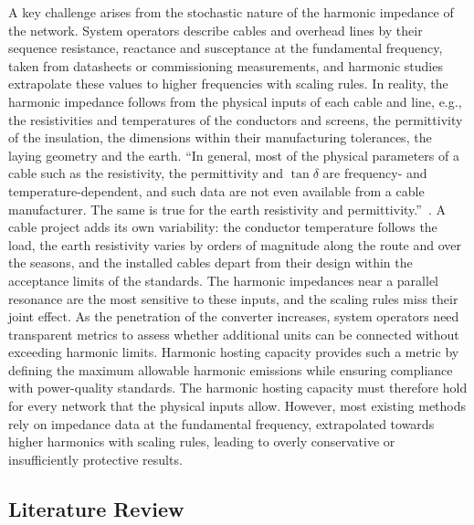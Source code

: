 A key challenge arises from the stochastic nature of the harmonic impedance of the network. System operators describe cables and overhead lines by their sequence resistance, reactance and susceptance at the fundamental frequency, taken from datasheets or commissioning measurements, and harmonic studies extrapolate these values to higher frequencies with scaling rules. In reality, the harmonic impedance follows from the physical inputs of each cable and line, e.g., the resistivities and temperatures of the conductors and screens, the permittivity of the insulation, the dimensions within their manufacturing tolerances, the laying geometry and the earth. ``In general, most of the physical parameters of a cable such as the resistivity, the permittivity and $\tan{\delta}$ are frequency- and temperature-dependent, and such data are not even available from a cable manufacturer. The same is true for the earth resistivity and permittivity.''~\cite[\S\,2.5.2.6]{ametani_cable_2015}. A cable project adds its own variability: the conductor temperature follows the load, the earth resistivity varies by orders of magnitude along the route and over the seasons, and the installed cables depart from their design within the acceptance limits of the standards. The harmonic impedances near a parallel resonance are the most sensitive to these inputs, and the scaling rules miss their joint effect. As the penetration of the converter increases, system operators need transparent metrics to assess whether additional units can be connected without exceeding harmonic limits. Harmonic hosting capacity provides such a metric by defining the maximum allowable harmonic emissions while ensuring compliance with power-quality standards.  The harmonic hosting capacity must therefore hold for every network that the physical inputs allow. However, most existing methods rely on impedance data at the fundamental frequency, extrapolated towards higher harmonics with scaling rules, leading to overly conservative or insufficiently protective results.

\subsection{Literature Review}
\label{sec:literature_review}

